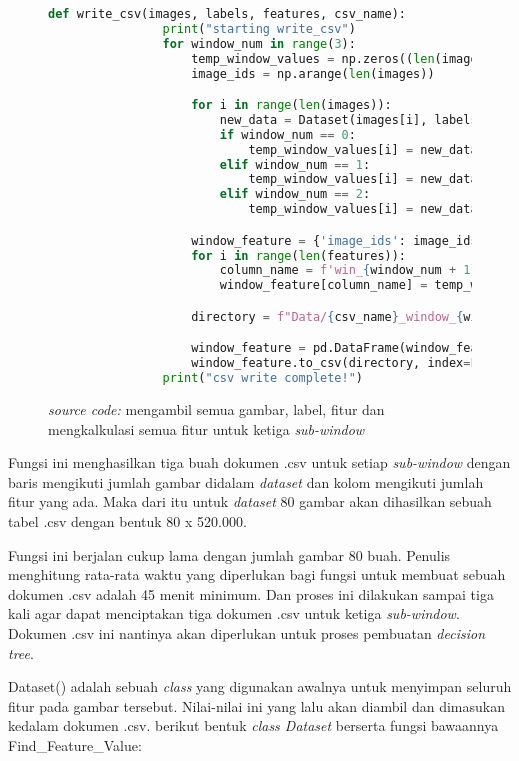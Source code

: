 	\begin{figure}[H]
		\begin{lstlisting}[language=Python, basicstyle=\tiny]
			def write_csv(images, labels, features, csv_name):
				print("starting write_csv")
				for window_num in range(3):
					temp_window_values = np.zeros((len(images), len(features)), dtype=object)
					image_ids = np.arange(len(images))

					for i in range(len(images)):
						new_data = Dataset(images[i], labels[i], features)
						if window_num == 0:
							temp_window_values[i] = new_data.window_1_features
						elif window_num == 1:
							temp_window_values[i] = new_data.window_2_features
						elif window_num == 2:
							temp_window_values[i] = new_data.window_3_features

					window_feature = {'image_ids': image_ids}
					for i in range(len(features)):
						column_name = f'win_{window_num + 1}_feature_{i}'
						window_feature[column_name] = temp_window_values[:, i]

					directory = f"Data/{csv_name}_window_{window_num}.csv"

					window_feature = pd.DataFrame(window_feature)
					window_feature.to_csv(directory, index=False)
				print("csv write complete!")
		\end{lstlisting}
		\caption{\emph{source code:} mengambil semua gambar, label, fitur dan mengkalkulasi 
		semua fitur untuk ketiga \textit{sub-window}}
		\label{code:calculate all features}
	\end{figure}

	Fungsi ini menghasilkan tiga buah dokumen .csv untuk setiap \textit{sub-window} dengan
	baris mengikuti jumlah gambar didalam \textit{dataset} dan kolom mengikuti jumlah fitur yang ada. 
	Maka dari itu untuk \emph{dataset} 80 gambar akan dihasilkan sebuah tabel .csv dengan 
	bentuk 80 x 520.000.

	Fungsi ini berjalan cukup lama dengan jumlah gambar 80 buah. Penulis menghitung rata-rata 
	waktu yang diperlukan bagi fungsi untuk membuat sebuah dokumen .csv adalah 45 menit minimum. 
	Dan proses ini dilakukan sampai tiga kali agar dapat menciptakan tiga dokumen .csv untuk ketiga 
	\textit{sub-window}. Dokumen .csv ini nantinya akan diperlukan untuk proses pembuatan \emph{decision tree}.

	Dataset() adalah sebuah \textit{class} yang digunakan awalnya untuk menyimpan seluruh fitur 
	pada gambar tersebut. Nilai-nilai ini yang lalu akan diambil dan dimasukan kedalam dokumen .csv. 
	berikut bentuk \textit{class Dataset} berserta fungsi bawaannya Find\_Feature\_Value:

